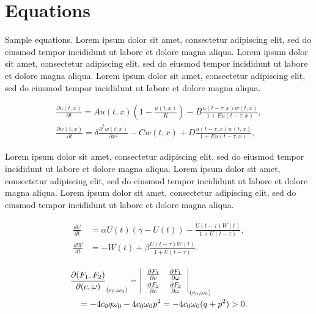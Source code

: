 \documentclass[
  journal=largetwo,
  manuscript=article-type,
  year=2020,
  volume=37,
]{cup-journal}
\begin{document}
\section{Equations}

Sample equations. Lorem ipsum dolor sit amet, consectetur adipiscing elit, sed do eiusmod tempor incididunt ut labore et dolore magna aliqua. Lorem ipsum dolor sit amet, consectetur adipiscing elit, sed do eiusmod tempor incididunt ut labore et dolore magna aliqua. Lorem ipsum dolor sit amet, consectetur adipiscing elit, sed do eiusmod tempor incididunt ut labore et dolore magna aliqua. 


\begin{equation}
\begin{aligned}\label{eq:first}
\frac{\partial u(t,x)}{\partial t} = Au(t,x) \left(1-\frac{u(t,x)}{K}\right)
-B\frac{u(t-\tau,x) w(t,x)}{1+Eu(t-\tau,x)},\\
\frac{\partial w(t,x)}{\partial t} =\delta \frac{\partial^2w(t,x)}{\partial x^2}-Cw(t,x)
+D\frac{u(t-\tau,x)w(t,x)}{1+Eu(t-\tau,x)},
\end{aligned}
\end{equation}

Lorem ipsum dolor sit amet, consectetur adipiscing elit, sed do eiusmod tempor incididunt ut labore et dolore magna aliqua. Lorem ipsum dolor sit amet, consectetur adipiscing elit, sed do eiusmod tempor incididunt ut labore et dolore magna aliqua. Lorem ipsum dolor sit amet, consectetur adipiscing elit, sed do eiusmod tempor incididunt ut labore et dolore magna aliqua. 

\begin{align}\label{eq:another}
\begin{split}
\frac{dU}{dt} &=\alpha U(t)(\gamma -U(t))-\frac{U(t-\tau)W(t)}{1+U(t-\tau)},\\
\frac{dW}{dt} &=-W(t)+\beta\frac{U(t-\tau)W(t)}{1+U(t-\tau)}.
\end{split}
\end{align}


\begin{align*}
&\frac{\partial(F_1,F_2)}{\partial(c,\omega)}_{(c_0,\omega_0)} = \left|
  \begin{array}{ll}
\frac{\partial F_1}{\partial c} &\frac{\partial F_1}{\partial \omega} \\\noalign{\vskip3pt}
\frac{\partial F_2}{\partial c}&\frac{\partial F_2}{\partial \omega}
\end{array}\right|_{(c_0,\omega_0)}\\
&\quad=-4c_0q\omega_0 -4c_0\omega_0p^2 =-4c_0\omega_0(q+p^2)>0.
\end{align*}
\end{document}

